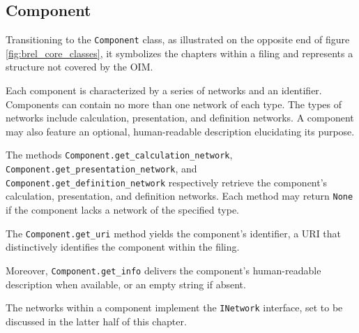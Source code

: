 \subsection{Component}


Transitioning to the \texttt{Component} class, as illustrated on the opposite end of figure \ref{fig:brel_core_classes}, 
it symbolizes the chapters within a filing and represents a structure not covered by the OIM.

Each component is characterized by a series of networks and an identifier.
Components can contain no more than one network of each type.
The types of networks include calculation, presentation, and definition networks.
A component may also feature an optional, human-readable description elucidating its purpose.

The methods \texttt{Component.get\_calculation\_network}, \texttt{Component.get\_presentation\_network}, 
and \texttt{Component.get\_definition\_network} respectively retrieve the component's calculation, presentation, and definition networks.
Each method may return \texttt{None} if the component lacks a network of the specified type.


The \texttt{Component.get\_uri} method yields the component's identifier, a URI that distinctively identifies the component within the filing.

Moreover, \texttt{Component.get\_info} delivers the component's human-readable description when available, or an empty string if absent.

The networks within a component implement the \texttt{INetwork} interface, set to be discussed in the latter half of this chapter.
